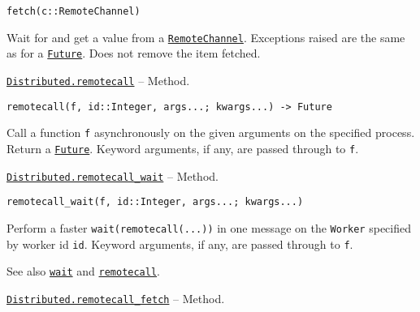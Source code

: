 \begin{adjustwidth}{2em}{0pt}


\begin{verbatim}
fetch(c::RemoteChannel)
\end{verbatim}

Wait for and get a value from a \hyperlink{16773267780467157552}{\texttt{RemoteChannel}}. Exceptions raised are the same as for a \hyperlink{4170271048165085864}{\texttt{Future}}. Does not remove the item fetched.



\end{adjustwidth}
\hypertarget{5405028821457292937}{}
\hyperlink{5405028821457292937}{\texttt{Distributed.remotecall}}  -- {Method.}

\begin{adjustwidth}{2em}{0pt}


\begin{verbatim}
remotecall(f, id::Integer, args...; kwargs...) -> Future
\end{verbatim}

Call a function \texttt{f} asynchronously on the given arguments on the specified process. Return a \hyperlink{4170271048165085864}{\texttt{Future}}. Keyword arguments, if any, are passed through to \texttt{f}.



\end{adjustwidth}
\hypertarget{5311233181018429027}{}
\hyperlink{5311233181018429027}{\texttt{Distributed.remotecall\_wait}}  -- {Method.}

\begin{adjustwidth}{2em}{0pt}


\begin{verbatim}
remotecall_wait(f, id::Integer, args...; kwargs...)
\end{verbatim}

Perform a faster \texttt{wait(remotecall(...))} in one message on the \texttt{Worker} specified by worker id \texttt{id}. Keyword arguments, if any, are passed through to \texttt{f}.

See also \hyperlink{13761789780433862250}{\texttt{wait}} and \hyperlink{5405028821457292937}{\texttt{remotecall}}.



\end{adjustwidth}
\hypertarget{17262349333771600150}{}
\hyperlink{17262349333771600150}{\texttt{Distributed.remotecall\_fetch}}  -- {Method.}

